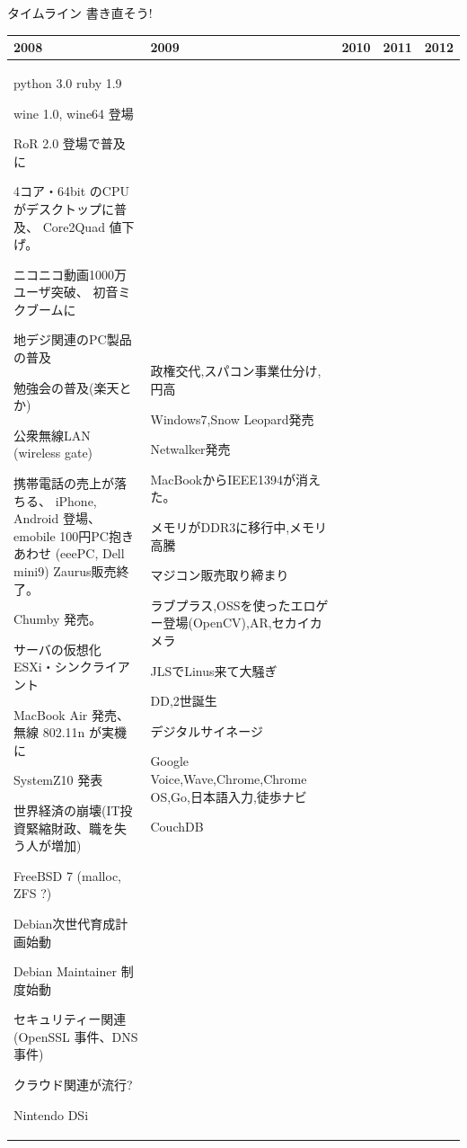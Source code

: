 \begin{frame}{タイムライン 書き直そう!}

{\scriptsize
\begin{tabular}[t]{|p{4em}|p{4em}|p{9em}|p{7em}|p{6em}|}
\hline
2008 &2009 & 2010 & 2011 & 2012 \\
\hline
python 3.0
ruby 1.9

wine 1.0, wine64 登場

RoR 2.0 登場で普及に

4コア・64bit のCPUがデスクトップに普及、
Core2Quad 値下げ。

ニコニコ動画1000万ユーザ突破、
初音ミクブームに

地デジ関連のPC製品の普及

勉強会の普及(楽天とか)

公衆無線LAN (wireless gate)

携帯電話の売上が落ちる、
iPhone, Android 登場、
emobile 100円PC抱きあわせ
(eeePC, Dell mini9)
Zaurus販売終了。

Chumby 発売。

サーバの仮想化 ESXi・シンクライアント

MacBook Air 発売、
無線 802.11n が実機に

SystemZ10 発表

世界経済の崩壊(IT投資緊縮財政、職を失う人が増加)

FreeBSD 7 (malloc, ZFS ?)

Debian次世代育成計画始動

Debian Maintainer 制度始動

セキュリティー関連(OpenSSL 事件、DNS事件)

クラウド関連が流行?

Nintendo DSi

&
政権交代,スパコン事業仕分け,円高

Windows7,Snow Leopard発売

Netwalker発売

MacBookからIEEE1394が消えた。

メモリがDDR3に移行中,メモリ高騰

マジコン販売取り締まり

ラブプラス,OSSを使ったエロゲー登場(OpenCV),AR,セカイカメラ

JLSでLinus来て大騒ぎ

DD,2世誕生

デジタルサイネージ

Google Voice,Wave,Chrome,Chrome OS,Go,日本語入力,徒歩ナビ

CouchDB


\end{tabular}}
\end{frame}
